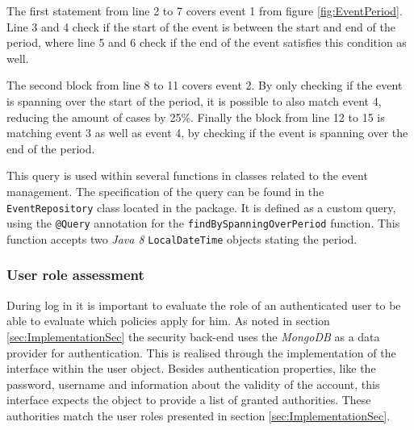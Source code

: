 The first statement from line 2 to 7 covers event 1 from figure \vref{fig:EventPeriod}. Line 3 and 4 check if the start of the event is between the start and end of the period, where line 5 and 6 check if the end of the event satisfies this condition as well. 

The second block from line 8 to 11 covers event 2. By only checking if the event is spanning over the start of the period, it is possible to also match event 4, reducing the amount of cases by 25\%. Finally the block from line 12 to 15 is matching event 3 as well as event 4, by checking if the event is spanning over the end of the period. 

This query is used within several functions in classes related to the event management. The specification of the query can be found in the \texttt{EventRepository} class located in the  package. It is defined as a custom query, using the \texttt{@Query} annotation for the \texttt{findBySpanningOverPeriod} function. This function accepts two \emph{Java 8} \texttt{LocalDateTime} objects stating the period.

\subsubsection{User role assessment}

During log in it is important to evaluate the role of an authenticated user to be able to evaluate which policies apply for him. As noted in section \vref{sec:ImplementationSec} the security back-end uses the \emph{MongoDB} as a data provider for authentication. This is realised through the implementation of the  interface within the user object. Besides authentication properties, like the password, username and information about the validity of the account, this interface expects the object to provide a list of granted authorities. These authorities match the user roles presented in section \vref{sec:ImplementationSec}. 

